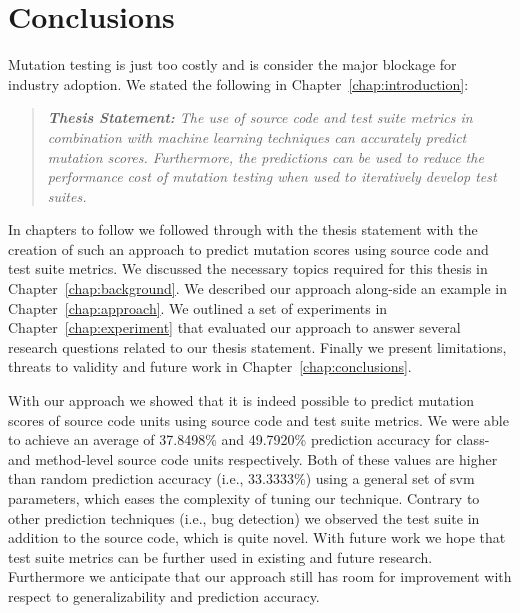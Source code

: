 \section{Conclusions}
\label{sec:conclusions_conclusions}
Mutation testing is just too costly and is consider the major blockage for industry adoption. We stated the following in Chapter~\ref{chap:introduction}:

\begin{quote}
  \emph{\textbf{Thesis Statement:} The use of source code and test suite metrics in combination with machine learning techniques can accurately predict mutation scores. Furthermore, the predictions can be used to reduce the performance cost of mutation testing when used to iteratively develop test suites.}
\end{quote}

In chapters to follow we followed through with the thesis statement with the creation of such an approach to predict mutation scores using source code and test suite metrics. We discussed the necessary topics required for this thesis in Chapter~\ref{chap:background}. We described our approach along-side an example in Chapter~\ref{chap:approach}. We outlined a set of experiments in Chapter~\ref{chap:experiment} that evaluated our approach to answer several research questions related to our thesis statement. Finally we present limitations, threats to validity and future work in Chapter~\ref{chap:conclusions}.

With our approach we showed that it is indeed possible to predict mutation scores of source code units using source code and test suite metrics. We were able to achieve an average of 37.8498\% and 49.7920\% prediction accuracy for class- and method-level source code units respectively. Both of these values are higher than random prediction accuracy (i.e., 33.3333\%) using a general set of \gls{svm} parameters, which eases the complexity of tuning our technique. Contrary to other prediction techniques (i.e., bug detection) we observed the test suite in addition to the source code, which is quite novel. With future work we hope that test suite metrics can be further used in existing and future research. Furthermore we anticipate that our approach still has room for improvement with respect to generalizability and prediction accuracy.
